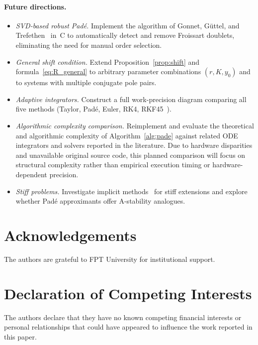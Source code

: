 \documentclass[12pt,a4paper]{article}
\theoremstyle{definition}
\theoremstyle{remark}
\begin{document}
\paragraph{Future directions.}
\begin{itemize}
  \item \textit{SVD-based robust Padé.}
        Implement the algorithm of Gonnet, Güttel, and
        Trefethen~\cite{gonnet2013} in~C to automatically detect and
        remove Froissart doublets, eliminating the need for manual
        order selection.
  \item \textit{General shift condition.}
        Extend Proposition~\ref{prop:shift} and
        formula~\eqref{eq:R_general} to arbitrary parameter
        combinations $(r, K, y_0)$ and to systems with multiple
        conjugate pole pairs.
  \item \textit{Adaptive integrators.}
        Construct a full work-precision diagram comparing all five
        methods (Taylor, Padé, Euler, RK4, RKF45~\cite{hairer1993}).
  \item \textit{Algorithmic complexity comparison.}
        Reimplement and evaluate the theoretical and algorithmic complexity of Algorithm~\ref{alg:pade} against related ODE integrators and solvers reported in the literature. Due to hardware disparities and unavailable original source code, this planned comparison will focus on structural complexity rather than empirical execution timing or hardware-dependent precision.
  \item \textit{Stiff problems.}
        Investigate implicit methods~\cite{lambert1991} for stiff
        extensions and explore whether Padé approximants offer
        A-stability analogues.
\end{itemize}

\section*{Acknowledgements}

The authors are grateful to FPT University for institutional support.

\section*{Declaration of Competing Interests}

The authors declare that they have no known competing financial
interests or personal relationships that could have appeared to
influence the work reported in this paper.
\end{document}
